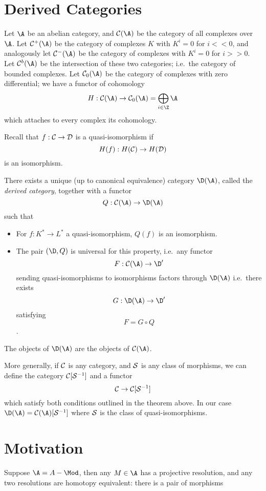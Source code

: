 \documentclass[etingof-dmod.tex]{subfiles}
\begin{document}
\rc{}

\section{Derived Categories}
Let $\A$ be an abelian category, and $\mc{C}(\A)$ be the category of all
complexes over $\A$. Let $\mc{C}^+(\A)$ be the category of complexes $K$ with
$K^i = 0$ for $i << 0$, and analogously let $\mc{C}^-(\A)$ be the category of
complexes with $K^i = 0$ for $i >>0$. Let $\mc{C}^b(\A)$ be the intersection of
these two categories; i.e.\ the category of bounded complexes. Let
$\mc{C}_0(\A)$ be the category of complexes with zero differential; we have a
functor of cohomology $$H : \mc{C}(\A) \rightarrow \mc{C}_0(\A) =
\bigoplus_{i\in\Z} \A$$ which attaches to every complex its cohomology.

Recall that $f : \mathcal{C} \rightarrow \mathcal{D}$ is a quasi-isomorphism if $$H(f):
H(\mathcal{C}) \rightarrow H(\mathcal{D})$$ is an isomorphism.

\begin{thm}
  There exists a unique (up to canonical equivalence) category $\D(\A)$,
  called the \textit{derived category}, together with a functor $$Q: \mc{C}(\A)
  \rightarrow \D(\A)$$ such that \begin{itemize}
    \item For $f : K^* \rightarrow L^*$ a quasi-isomorphism, $Q(f)$ is an
      isomorphism.
    \item The pair $(\D,Q)$ is universal for this property, i.e.\ any
      functor $$F: \mc{C}(\A) \rightarrow \D'$$ sending quasi-isomorphisms to
      isomorphisms factors through $\D(\A)$ i.e.\ there exists $$G: \D(\A) \rightarrow
      \D'$$ satisfying $$F = G\circ Q$$.
  \end{itemize}
  The objects of $\D(\A)$ are the objects of $\mc{C}(\A)$.
\end{thm}
\begin{rmk}
  More generally, if $\mathcal{C}$ is any category, and $\mathcal{S}$ is any class of
  morphisms, we can define the category $\mathcal{C}[\mathcal{S}^{-1}]$ and a functor
  $$\mathcal{C} \rightarrow \mathcal{C}[\mathcal{S}^{-1}]$$ which satisfy both conditions
  outlined in the theorem above. In our case $\D(\A) =
  \mc{C}(\A)[\mc{S}^{-1}]$ where $\mathcal{S}$ is the class of quasi-isomorphisms.
\end{rmk}
\section{Motivation}
Suppose $\A = A-\Mod$, then any $M \in \A$ has a projective resolution, and any
two resolutions are homotopy equivalent: there is a pair of morphisms
\end{document}
